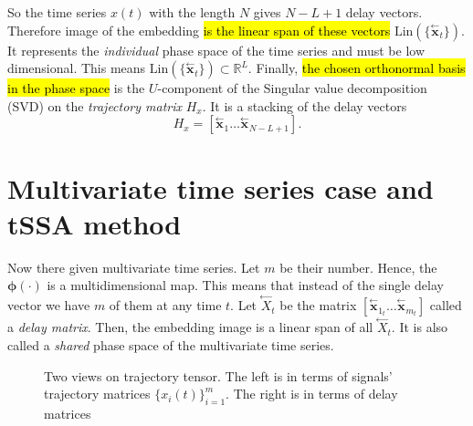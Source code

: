 \documentclass[referee, pdflatex, sn-mathphys-num]{sn-jnl}
\theoremstyle{definition}
\theoremstyle{plain}
\newcommand{\delayV}[1]{\overset{\leftarrow}{\mathbf{x}}_{#1}}
\newcommand{\delayM}[1]{\overset{\leftarrow}{X}_{#1}}
\begin{document}
	So the time series $ x(t) $ with the length $ N $ gives $ N - L + 1 $ delay vectors. Therefore image of the embedding \hl{is the linear span of these vectors} $ \text{Lin}(\{\delayV{t}\}) $. It represents the \emph{individual} phase space of the time series and must be low dimensional. This means $ \text{Lin}(\{\delayV{t}\}) \subset \mathbb{R}^L $. Finally, \hl{the chosen orthonormal basis in the phase space} is the $ U $-component of the Singular value decomposition (SVD) on the \emph{trajectory matrix} $ H_x $. It is a stacking of the delay vectors	\[
		H_x = [ \delayV{1} \ldots  \delayV{N - L + 1}].
	\]
	
	\section{Multivariate time series case and tSSA method}\label{sec:tssa_method}
	
	Now there given multivariate time series. Let $ m $ be their number. Hence, the $ \boldsymbol{\phi}(\cdot) $ is a multidimensional map. This means that instead of the single delay vector we have $ m $ of them at any time $ t $. Let $ \delayM{t} $ be the matrix $ [ \delayV{1_t} \ldots \delayV{m_t} ] $ called a \emph{delay matrix}. Then, the embedding image is a linear span of all $ \delayM{t} $. It is also called a \emph{shared} phase space of the multivariate time series.
	
	\begin{figure}[!htbp]
		\centering
		
		\caption{Two views on trajectory tensor. The left is in terms of signals' trajectory matrices $ \{x_i(t)\}_{i=1}^m $. The right is in terms of delay matrices}\label{pic:traj_tensor}
	\end{figure}
	
\end{document}
